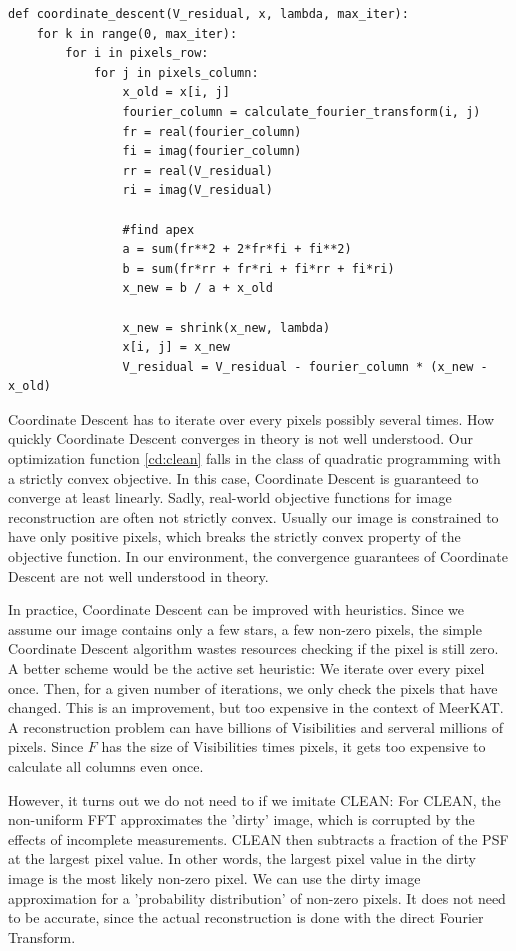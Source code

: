 \begin{lstlisting} 
def coordinate_descent(V_residual, x, lambda, max_iter):
	for k in range(0, max_iter):
		for i in pixels_row:
			for j in pixels_column:
				x_old = x[i, j]
				fourier_column = calculate_fourier_transform(i, j)
				fr = real(fourier_column)
				fi = imag(fourier_column)
				rr = real(V_residual)
				ri = imag(V_residual)
				
				#find apex
				a = sum(fr**2 + 2*fr*fi + fi**2)
				b = sum(fr*rr + fr*ri + fi*rr + fi*ri)
				x_new = b / a + x_old
				
				x_new = shrink(x_new, lambda)
				x[i, j] = x_new
				V_residual = V_residual - fourier_column * (x_new - x_old)
\end{lstlisting}\label{cd:basic}

Coordinate Descent has to iterate over every pixels possibly several times. How quickly Coordinate Descent converges in theory is not well understood. Our optimization function \eqref{cd:clean} falls in the class of quadratic programming with a strictly convex objective. In this case, Coordinate Descent is guaranteed to converge at least linearly\cite{luo1992convergence}. Sadly, real-world objective functions for image reconstruction are often not strictly convex. Usually our image is constrained to have only positive pixels\cite{mcewen2011compressed}, which breaks the strictly convex property of the objective function. In our environment, the convergence guarantees of Coordinate Descent are not well understood in theory.

In practice, Coordinate Descent can be improved with heuristics. Since we assume our image contains only a few stars, a few non-zero pixels, the simple Coordinate Descent algorithm wastes resources checking if the pixel is still zero. A better scheme would be the active set heuristic\cite{friedman2010regularization}: We iterate over every pixel once. Then, for a given number of iterations, we only check the pixels that have changed. This is an improvement, but too expensive in the context of MeerKAT. A reconstruction problem can have billions of Visibilities and serveral millions of pixels. Since $F$ has the size of Visibilities times pixels, it gets too expensive to calculate all columns even once.

However, it turns out we do not need to if we imitate CLEAN: For CLEAN, the non-uniform FFT approximates the 'dirty' image, which is corrupted by the effects of incomplete measurements. CLEAN then subtracts a fraction of the PSF at the largest pixel value. In other words, the largest pixel value in the dirty image is the most likely non-zero pixel. We can use the dirty image approximation for a 'probability distribution' of non-zero pixels. It does not need to be accurate, since the actual reconstruction is done with the direct Fourier Transform.

